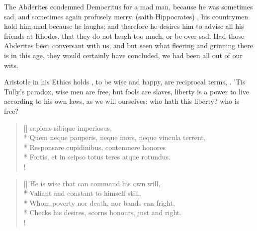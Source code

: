 The Abderites condemned Democritus for a mad man, because he was
sometimes sad, and sometimes again profusely merry.  (saith
Hippocrates) , his countrymen hold
him mad because he laughs; and therefore he desires him to advise
all his friends at Rhodes, that they do not laugh too much, or be over
sad. Had those Abderites been conversant with us, and but seen what
 fleering and grinning there is in this age, they would certainly
have concluded, we had been all out of our wits.

Aristotle in his Ethics holds , to be wise and
happy, are reciprocal terms, . 'Tis 
Tully's paradox, wise men are free, but fools are slaves, liberty is a
power to live according to his own laws, as we will ourselves: who hath
this liberty? who is free?
%
\begin{latin}
\settowidth{\versewidth}{Quem neque pauperis, neque mors, neque vincula terrent,}
\begin{verse}[\versewidth]
sapiens sibique imperiosus,\\*
Quem neque pauperis, neque mors, neque vincula terrent,\\*
Responsare cupidinibus, contemnere honores\\*
Fortis, et in seipso totus teres atque rotundus.\\!
\end{verse}
\end{latin}
\translationrule
\settowidth{\versewidth}{Checks his desires, scorns honours, just and right.}
\begin{verse}[\versewidth]
He is wise that can command his own will,\\*
Valiant and constant to himself still,\\*
Whom poverty nor death, nor bands can fright,\\*
Checks his desires, scorns honours, just and right.\\!
\end{verse}
%

